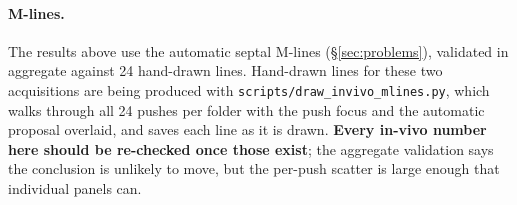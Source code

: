 \documentclass[11pt,a4paper]{article}
\newcommand{\caveat}[1]{\textcolor{orange!75!black}{\textbf{#1}}}
\begin{document}
\paragraph{M-lines.} The results above use the automatic septal M-lines
(\S\ref{sec:problems}), validated in aggregate against 24 hand-drawn lines. Hand-drawn lines for
these two acquisitions are being produced with \texttt{scripts/draw\_invivo\_mlines.py}, which
walks through all 24 pushes per folder with the push focus and the automatic proposal overlaid, and
saves each line as it is drawn. \caveat{Every in-vivo number here should be re-checked once those
exist}; the aggregate validation says the conclusion is unlikely to move, but the per-push scatter
is large enough that individual panels can.

\end{document}
